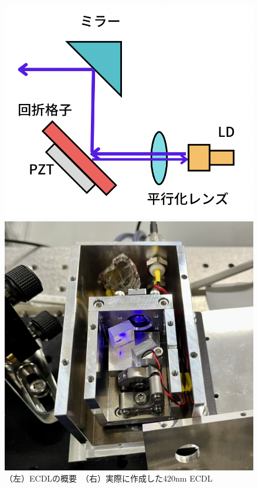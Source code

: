 \documentclass[dvipdfmx]{jsreport}
\begin{document}
\begin{figure}[hbtp]
\centering
\begin{minipage}[b]{0.4\linewidth}
\includegraphics[width=1\textwidth]{images/ecdl.png}
\end{minipage}
\begin{minipage}[b]{0.45\linewidth}
\includegraphics[width=1\textwidth]{images/ecdl_real.jpg}
\end{minipage}
\caption{\label{fig:ecdl}（左）ECDLの概要　（右）実際に作成した420nm ECDL}
\end{figure}
\end{document}
